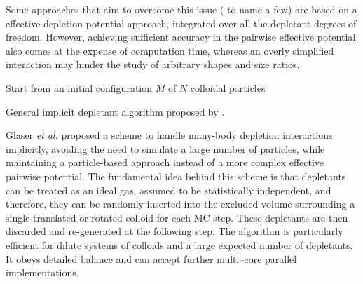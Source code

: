 Some approaches that aim to overcome this issue (\cite{bolhuis_jcp1997,PhysRevE.73.041404,Henzie2011} to name a few) are based on a effective depletion potential approach, integrated over all the depletant degrees of freedom. However, achieving sufficient accuracy in the pairwise effective potential also comes at the expense of computation time, whereas an overly simplified interaction may hinder the study of arbitrary shapes and size ratios.


\begin{algorithm}[h]
    \SetAlgoLined

    Start from an initial configuration $M$ of $N$ colloidal particles\;
    \caption{General implicit depletant algorithm proposed by \cite{glaser2015parallel}.}
    \label{algo:implicit}
\end{algorithm}

Glaser {\em et al.} \cite{glaser2015parallel} proposed a scheme to handle many-body depletion interactions implicitly, avoiding the need to simulate a large number of particles, while maintaining a particle-based approach instead of a more complex effective pairwise potential. The fundamental idea behind this scheme is that depletants can be treated as an ideal gas, assumed to be statistically independent, and therefore, they can be randomly inserted into the excluded volume surrounding a single translated or rotated colloid for each MC step. These depletants are then discarded and re-generated at the following step. The algorithm is particularly efficient for dilute systems of colloids and a large expected number of depletants. It obeys detailed balance and can accept further multi--core parallel implementations.

